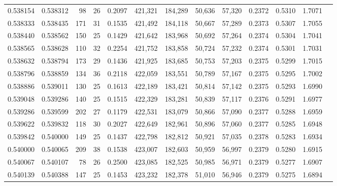\begin{tabular}{rrrrrrrrrrrrr}
0.538154 & 0.538312 &     98 &    26 &                                     0.2097 & 421,321 & 184,289 &  50,636 &  57,320 & 0.2372 & 0.5310 & 1.7071 \\
0.538333 & 0.538435 &    171 &    31 &                                     0.1535 & 421,492 & 184,118 &  50,667 &  57,289 & 0.2373 & 0.5307 & 1.7055 \\
0.538440 & 0.538562 &    150 &    25 &                                     0.1429 & 421,642 & 183,968 &  50,692 &  57,264 & 0.2374 & 0.5304 & 1.7041 \\
0.538565 & 0.538628 &    110 &    32 &                                     0.2254 & 421,752 & 183,858 &  50,724 &  57,232 & 0.2374 & 0.5301 & 1.7031 \\
0.538632 & 0.538794 &    173 &    29 &                                     0.1436 & 421,925 & 183,685 &  50,753 &  57,203 & 0.2375 & 0.5299 & 1.7015 \\
0.538796 & 0.538859 &    134 &    36 &                                     0.2118 & 422,059 & 183,551 &  50,789 &  57,167 & 0.2375 & 0.5295 & 1.7002 \\
0.538886 & 0.539011 &    130 &    25 &                                     0.1613 & 422,189 & 183,421 &  50,814 &  57,142 & 0.2375 & 0.5293 & 1.6990 \\
0.539048 & 0.539286 &    140 &    25 &                                     0.1515 & 422,329 & 183,281 &  50,839 &  57,117 & 0.2376 & 0.5291 & 1.6977 \\
0.539286 & 0.539599 &    202 &    27 &                                     0.1179 & 422,531 & 183,079 &  50,866 &  57,090 & 0.2377 & 0.5288 & 1.6959 \\
0.539622 & 0.539832 &    118 &    30 &                                     0.2027 & 422,649 & 182,961 &  50,896 &  57,060 & 0.2377 & 0.5285 & 1.6948 \\
0.539842 & 0.540000 &    149 &    25 &                                     0.1437 & 422,798 & 182,812 &  50,921 &  57,035 & 0.2378 & 0.5283 & 1.6934 \\
0.540000 & 0.540065 &    209 &    38 &                                     0.1538 & 423,007 & 182,603 &  50,959 &  56,997 & 0.2379 & 0.5280 & 1.6915 \\
0.540067 & 0.540107 &     78 &    26 &                                     0.2500 & 423,085 & 182,525 &  50,985 &  56,971 & 0.2379 & 0.5277 & 1.6907 \\
0.540139 & 0.540388 &    147 &    25 &                                     0.1453 & 423,232 & 182,378 &  51,010 &  56,946 & 0.2379 & 0.5275 & 1.6894 \\

\end{tabular}
